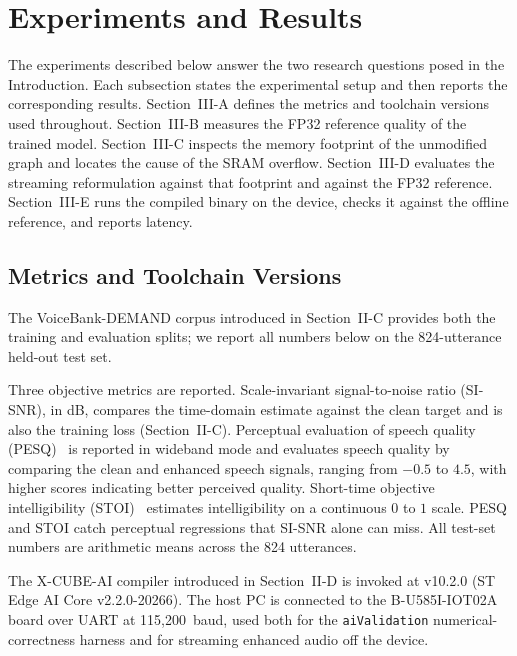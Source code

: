 \documentclass[conference]{IEEEtran}
\begin{document}
\section{Experiments and Results}
The experiments described below answer the two research questions posed in the Introduction. Each subsection states the experimental setup and then reports the corresponding results. Section~III-A defines the metrics and toolchain versions used throughout. Section~III-B measures the FP32 reference quality of the trained model. Section~III-C inspects the memory footprint of the unmodified graph and locates the cause of the SRAM overflow. Section~III-D evaluates the streaming reformulation against that footprint and against the FP32 reference. Section~III-E runs the compiled binary on the device, checks it against the offline reference, and reports latency.



\subsection{Metrics and Toolchain Versions}

The VoiceBank-DEMAND corpus introduced in Section~II-C provides both the training and evaluation splits; we report all numbers below on the 824-utterance held-out test set.

Three objective metrics are reported. Scale-invariant signal-to-noise ratio (SI-SNR), in dB, compares the time-domain estimate against the clean target and is also the training loss (Section~II-C). Perceptual evaluation of speech quality (PESQ)~\cite{pesq} is reported in wideband mode and evaluates speech quality by comparing the clean and enhanced speech signals, ranging from $-0.5$ to $4.5$, with higher scores indicating better perceived quality. Short-time objective intelligibility (STOI)~\cite{stoi} estimates intelligibility on a continuous $0$ to $1$ scale. PESQ and STOI catch perceptual regressions that SI-SNR alone can miss. All test-set numbers are arithmetic means across the 824 utterances.

The X-CUBE-AI compiler introduced in Section~II-D is invoked at v10.2.0 (ST Edge AI Core v2.2.0-20266). The host PC is connected to the B-U585I-IOT02A board over UART at 115{,}200~baud, used both for the \texttt{aiValidation} numerical-correctness harness and for streaming enhanced audio off the device.
\end{document}
